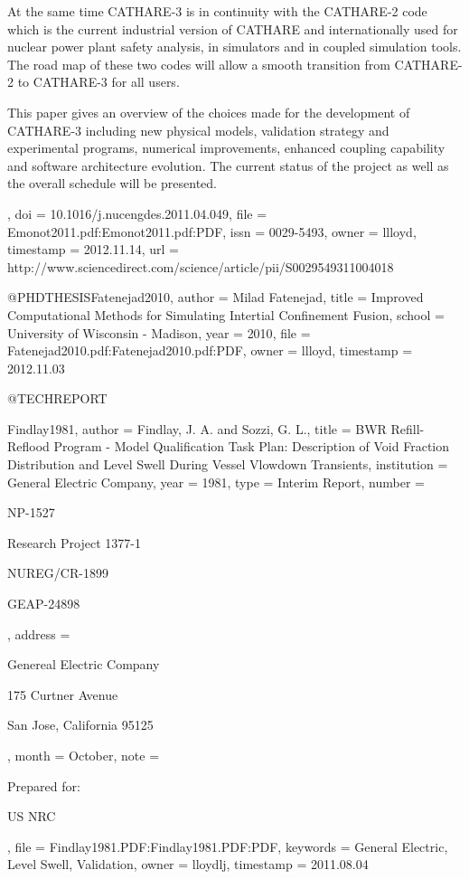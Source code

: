 {{{	
	At the same time CATHARE-3 is in continuity with the CATHARE-2 code
	which is the current industrial version of CATHARE and internationally
	used for nuclear power plant safety analysis, in simulators and in
	coupled simulation tools. The road map of these two codes will allow
	a smooth transition from CATHARE-2 to CATHARE-3 for all users.
	
	This paper gives an overview of the choices made for the development
	of CATHARE-3 including new physical models, validation strategy and
	experimental programs, numerical improvements, enhanced coupling
	capability and software architecture evolution. The current status
	of the project as well as the overall schedule will be presented.},
  doi = {10.1016/j.nucengdes.2011.04.049},
  file = {Emonot2011.pdf:Emonot2011.pdf:PDF},
  issn = {0029-5493},
  owner = {llloyd},
  timestamp = {2012.11.14},
  url = {http://www.sciencedirect.com/science/article/pii/S0029549311004018}
}

@PHDTHESIS{Fatenejad2010,
  author = {Milad Fatenejad},
  title = {Improved Computational Methods for Simulating Intertial Confinement
	Fusion},
  school = {University of Wisconsin - Madison},
  year = {2010},
  file = {Fatenejad2010.pdf:Fatenejad2010.pdf:PDF},
  owner = {llloyd},
  timestamp = {2012.11.03}
}

@TECHREPORT{Findlay1981,
  author = {Findlay, J. A. and Sozzi, G. L.},
  title = {BWR Refill-Reflood Program - Model Qualification Task Plan: Description
	of Void Fraction Distribution and Level Swell During Vessel Vlowdown
	Transients},
  institution = {General Electric Company},
  year = {1981},
  type = {Interim Report},
  number = {NP-1527
	
	Research Project 1377-1
	
	NUREG/CR-1899
	
	GEAP-24898},
  address = {Genereal Electric Company
	
	175 Curtner Avenue
	
	San Jose, California 95125},
  month = {October},
  note = {Prepared for:
	
	US NRC},
  file = {Findlay1981.PDF:Findlay1981.PDF:PDF},
  keywords = {General Electric, Level Swell, Validation},
  owner = {lloydlj},
  timestamp = {2011.08.04}
}

}
